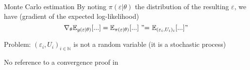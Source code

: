 \begin{frame}{Monte Carlo estimation}
  By noting $\pi(\varepsilon|\theta)$ the distribution of the resulting $\varepsilon$, we have (gradient of the expected log-likelihood)
  $$ \nabla_\theta \mathbb{E}_{g(\varepsilon|\theta)}[...] = \mathbb{E}_{\pi(\varepsilon|\theta)}[...] ~ {"}{=} ~ \mathbb{E}_{(\varepsilon_i, U_i)_i}[...]" $$
  \medskip


  Problem: $(\varepsilon_i, U_i)_{i \in \mathbb{N}}$ is not a random variable
  (it is a stochastic process)

  No reference to a convergence proof in \cite{davidson_hyperspherical_2022,naesseth2020reparameterization,paisley2012variational,mnih2014neural}
\end{frame}
